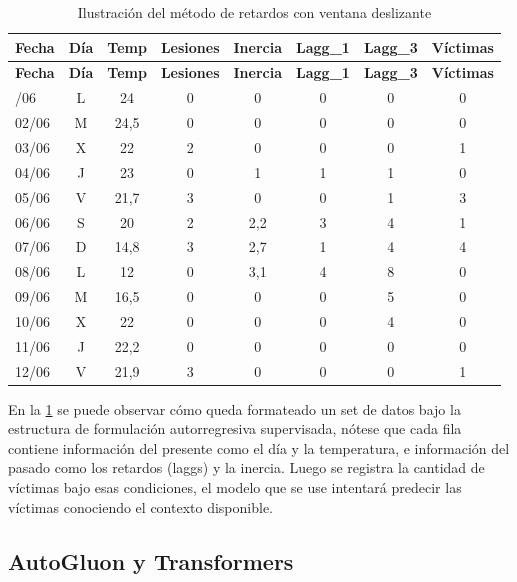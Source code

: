 \begin{longtable}[]{@{}lccccccc@{}}
\caption{Ilustración del método de retardos con ventana deslizante}
\label{tab:ilustracion-sobre-el-metodo-de-retardos-}\\
\toprule\noalign{}
\textbf{Fecha} & \textbf{Día} & \textbf{Temp} & \textbf{Lesiones} & \textbf{Inercia} & \textbf{Lagg\_1} & \textbf{Lagg\_3} & \textbf{Víctimas} \\
\midrule\noalign{}
\endfirsthead
\toprule\noalign{}
\textbf{Fecha} & \textbf{Día} & \textbf{Temp} & \textbf{Lesiones} & \textbf{Inercia} & \textbf{Lagg\_1} & \textbf{Lagg\_3} & \textbf{Víctimas} \\
\midrule\noalign{}
\endhead
\bottomrule\noalign{}
\endlastfoot
01/06 & L & 24 & 0 & 0 & 0 & 0 & 0 \\
02/06 & M & 24,5 & 0 & 0 & 0 & 0 & 0 \\
03/06 & X & 22 & 2 & 0 & 0 & 0 & 1 \\
04/06 & J & 23 & 0 & 1 & 1 & 1 & 0 \\
05/06 & V & 21,7 & 3 & 0 & 0 & 1 & 3 \\
06/06 & S & 20 & 2 & 2,2 & 3 & 4 & 1 \\
07/06 & D & 14,8 & 3 & 2,7 & 1 & 4 & 4 \\
08/06 & L & 12 & 0 & 3,1 & 4 & 8 & 0 \\
09/06 & M & 16,5 & 0 & 0 & 0 & 5 & 0 \\
10/06 & X & 22 & 0 & 0 & 0 & 4 & 0 \\
11/06 & J & 22,2 & 0 & 0 & 0 & 0 & 0 \\
12/06 & V & 21,9 & 3 & 0 & 0 & 0 & 1 \\
\end{longtable}


En la \cref{tab:ilustracion-sobre-el-metodo-de-retardos-} se puede observar cómo queda formateado un set de datos bajo la estructura de formulación autorregresiva supervisada, nótese que cada fila contiene información del presente como el día y la temperatura, e información del pasado como los retardos (laggs) y la inercia. Luego se registra la cantidad de víctimas bajo esas condiciones, el modelo que se use intentará predecir las víctimas conociendo el contexto disponible.

\subsection{AutoGluon y Transformers}\label{auto-gluon-y-transformers}

